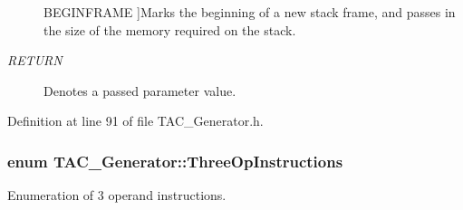 \begin{Desc}
\begin{description}
{\hypertarget{classTAC__Generator_ab58b7044cb5d16a454f4e01514175123a2900d0c97873b8e4282491148b366771}{B\-E\-G\-I\-N\-F\-R\-A\-M\-E}\label{classTAC__Generator_ab58b7044cb5d16a454f4e01514175123a2900d0c97873b8e4282491148b366771}
}]Marks the beginning of a new stack frame, and passes in the size of the memory required on the stack. \item[{\em 
\hypertarget{classTAC__Generator_ab58b7044cb5d16a454f4e01514175123a0e868fa94bac0750a62dfa98d0f56510}{R\-E\-T\-U\-R\-N}\label{classTAC__Generator_ab58b7044cb5d16a454f4e01514175123a0e868fa94bac0750a62dfa98d0f56510}
}]Denotes a passed parameter value. \end{description}
\end{Desc}


Definition at line 91 of file T\-A\-C\-\_\-\-Generator.\-h.

\hypertarget{classTAC__Generator_ae032b80a215a10604c5273b65e7dab4c}{
\subsubsection[{Three\-Op\-Instructions}]{\setlength{\rightskip}{0pt plus 5cm}enum {\bf T\-A\-C\-\_\-\-Generator\-::\-Three\-Op\-Instructions}}}\label{classTAC__Generator_ae032b80a215a10604c5273b65e7dab4c}


Enumeration of 3 operand instructions. 

